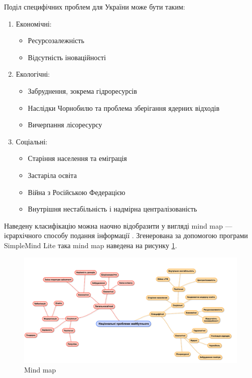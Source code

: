         Поділ специфічних проблем для України може бути таким:

        \begin{enumerate}
            \item Економічні:
            \begin{itemize}
                \item Ресурсозалежність
                \item Відсутність іноваційності
            \end{itemize}

            \item Екологічні:
            \begin{itemize}
                \item Забруднення, зокрема гідроресурсів
                \item Наслідки Чорнобилю та проблема зберігання ядерних відходів
                \item Вичерпання лісоресурсу
            \end{itemize}

            \item Соціальні:
            \begin{itemize}
                \item Старіння населення та еміграція
                \item Застаріла освіта
                \item Війна з Російською Федерацією
                \item Внутрішня нестабільність і надмірна централізованість
            \end{itemize}
        \end{enumerate}

        Наведену класифікацію можна наочно відобразити у вигляді mind map --- ієрархічного
        способу подання інформації \cite{hopper2015practicing}. Згенерована за
        допомогою програми SimpleMind Lite \cite{simplemind} така mind map наведена на рисунку \ref{fig:mindmap}.

        \begin{figure}[!htp]
            \centering
            \includegraphics[scale = 0.5]{PNG/mindmap.png}
            \caption{Mind map}
            \label{fig:mindmap}
        \end{figure}


